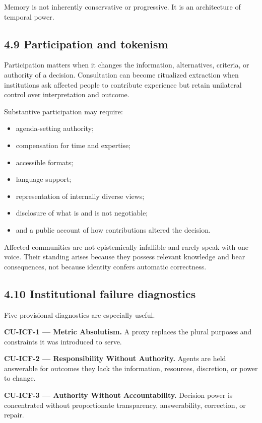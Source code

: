 \documentclass[
  11pt,
]{article}
\providecommand{\tightlist}{%
  \setlength{\itemsep}{0pt}\setlength{\parskip}{0pt}}
\begin{document}
Memory is not inherently conservative or progressive. It is an
architecture of temporal power.

\subsection{4.9 Participation and
tokenism}\label{participation-and-tokenism}

Participation matters when it changes the information, alternatives,
criteria, or authority of a decision. Consultation can become ritualized
extraction when institutions ask affected people to contribute
experience but retain unilateral control over interpretation and
outcome.

Substantive participation may require:

\begin{itemize}
\tightlist
\item
  agenda-setting authority;
\item
  compensation for time and expertise;
\item
  accessible formats;
\item
  language support;
\item
  representation of internally diverse views;
\item
  disclosure of what is and is not negotiable;
\item
  and a public account of how contributions altered the decision.
\end{itemize}

Affected communities are not epistemically infallible and rarely speak
with one voice. Their standing arises because they possess relevant
knowledge and bear consequences, not because identity confers automatic
correctness.

\subsection{4.10 Institutional failure
diagnostics}\label{institutional-failure-diagnostics}

Five provisional diagnostics are especially useful.

\textbf{CU-ICF-1 --- Metric Absolutism.} A proxy replaces the plural
purposes and constraints it was introduced to serve.

\textbf{CU-ICF-2 --- Responsibility Without Authority.} Agents are held
answerable for outcomes they lack the information, resources,
discretion, or power to change.

\textbf{CU-ICF-3 --- Authority Without Accountability.} Decision power
is concentrated without proportionate transparency, answerability,
correction, or repair.
\end{document}
